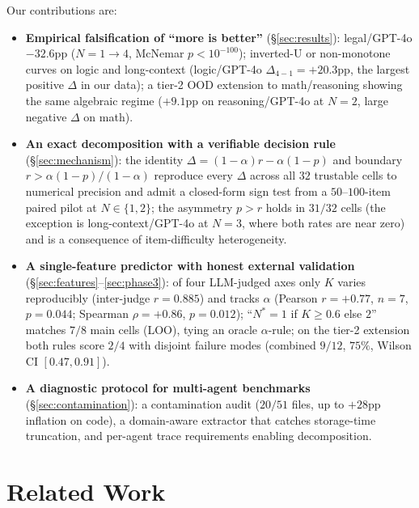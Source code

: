 \documentclass{article}
\begin{document}
Our contributions are:
\begin{itemize}\setlength{\itemsep}{1pt}
\item \textbf{Empirical falsification of ``more is better''} (\S\ref{sec:results}): legal/GPT-4o $-32.6$pp ($N{=}1{\to}4$, McNemar $p{<}10^{-100}$); inverted-U or non-monotone curves on logic and long-context (logic/GPT-4o $\Delta_{4-1}{=}{+}20.3$pp, the largest positive $\Delta$ in our data); a tier-2 OOD extension to math/reasoning showing the same algebraic regime ($+9.1$pp on reasoning/GPT-4o at $N{=}2$, large negative $\Delta$ on math).
\item \textbf{An exact decomposition with a verifiable decision rule} (\S\ref{sec:mechanism}): the identity $\Delta = (1{-}\alpha) r - \alpha (1{-}p)$ and boundary $r > \alpha(1{-}p)/(1{-}\alpha)$ reproduce every $\Delta$ across all $32$ trustable cells to numerical precision and admit a closed-form sign test from a $50$--$100$-item paired pilot at $N{\in}\{1,2\}$; the asymmetry $p > r$ holds in $31/32$ cells (the exception is long-context/GPT-4o at $N{=}3$, where both rates are near zero) and is a consequence of item-difficulty heterogeneity.
\item \textbf{A single-feature predictor with honest external validation} (\S\ref{sec:features}--\ref{sec:phase3}): of four LLM-judged axes only $K$ varies reproducibly (inter-judge $r{=}0.885$) and tracks $\alpha$ (Pearson $r{=}{+}0.77$, $n{=}7$, $p{=}0.044$; Spearman $\rho{=}+0.86$, $p{=}0.012$); ``$N^{*}{=}1$ if $K{\geq}0.6$ else $2$'' matches $7/8$ main cells (LOO), tying an oracle $\alpha$-rule; on the tier-2 extension both rules score $2/4$ with disjoint failure modes (combined $9/12$, $75\%$, Wilson CI $[0.47, 0.91]$).
\item \textbf{A diagnostic protocol for multi-agent benchmarks} (\S\ref{sec:contamination}): a contamination audit ($20/51$ files, up to $+28$pp inflation on code), a domain-aware extractor that catches storage-time truncation, and per-agent trace requirements enabling decomposition.
\end{itemize}


\section{Related Work}
\label{sec:related}
\end{document}
